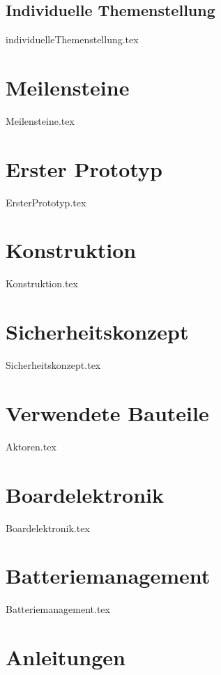 \documentclass[paper=a4,12pt]{scrreprt}
\begin{document}
\section{Individuelle Themenstellung}
{individuelleThemenstellung.tex}

\chapter{Meilensteine}
{Meilensteine.tex}

\chapter{Erster Prototyp}
{ErsterPrototyp.tex}

\chapter{Konstruktion}
{Konstruktion.tex}


\chapter{Sicherheitskonzept}
{Sicherheitskonzept.tex}

\chapter{Verwendete Bauteile}
{Aktoren.tex}
\chapter{Boardelektronik}
{Boardelektronik.tex}

\chapter{Batteriemanagement}
{Batteriemanagement.tex}

\chapter{Anleitungen}
\end{document}
